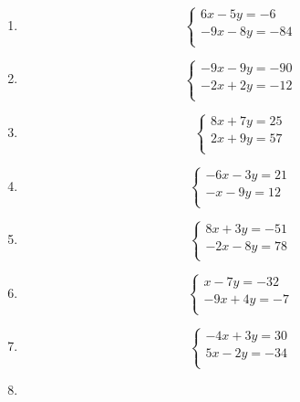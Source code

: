 \documentclass[24 pt]{article}
\begin{document}
\begin{enumerate}
\item
\begin{equation*}
\begin{cases}
6x-5y=-6\\
-9x-8y=-84\\
\end{cases}
\end{equation*}
\item
\begin{equation*}
\begin{cases}
-9x-9y=-90\\
-2x+2y=-12\\
\end{cases}
\end{equation*}
\item
\begin{equation*}
\begin{cases}
8x+7y=25\\
2x+9y=57\\
\end{cases}
\end{equation*}
\item
\begin{equation*}
\begin{cases}
-6x-3y=21\\
-x-9y=12\\
\end{cases}
\end{equation*}
\item
\begin{equation*}
\begin{cases}
8x+3y=-51\\
-2x-8y=78\\
\end{cases}
\end{equation*}
\item
\begin{equation*}
\begin{cases}
x-7y=-32\\
-9x+4y=-7\\
\end{cases}
\end{equation*}
\item
\begin{equation*}
\begin{cases}
-4x+3y=30\\
5x-2y=-34\\
\end{cases}
\end{equation*}
\item

\end{enumerate}
\end{document}
